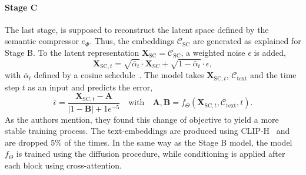 \paragraph*{Stage C} The last stage, is supposed to reconstruct the latent space
defined by the semantic compressor $e_\Phi$. Thus, the embeddings
$\mathcal{C}_{\text{SC}}$ are generated as explained for Stage B. To the latent
representation $\boldsymbol{X}_{\text{SC}} = \mathcal{C}_{\text{SC}}$, a weighted noise $\epsilon$
is added,
\begin{equation}
    \boldsymbol{X}_{\text{SC}, t} = \sqrt{\bar{\alpha}_t}\cdot\boldsymbol{X}_{\text{SC}}+\sqrt{1-\bar{\alpha}_t}\cdot\epsilon,
\end{equation}
with $\bar{\alpha}_t$ defined by a cosine schedule~\cite{Nichol2021ImprovedDenoisingDiffusionProbabilisticModels}.
The model takes $\boldsymbol{X}_{\text{SC}, t}$, $\mathcal{C}_{\text{text}}$ and
the time step $t$ as an input and predicts the error,
\begin{equation}
    \bar{\epsilon} = \frac{\boldsymbol{X}_{\text{SC}, t} - \boldsymbol{A}}{|1-\boldsymbol{B}| + 1e^{-5}} \quad \text{with} \quad \boldsymbol{A}, \boldsymbol{B} = f_\Theta(\boldsymbol{X}_{\text{SC}, t},\mathcal{C}_{\text{text}}, t).
\end{equation}
As the authors mention, they found this change of objective to yield a more
stable training process. The text-embeddings are produced using
CLIP-H~\cite{Ilharco2021OpenCLIP} and are dropped 5\% of the times. In the same
way as the Stage B model, the model $f_\Theta$ is trained using the diffusion
procedure, while conditioning is applied after each block using cross-attention.